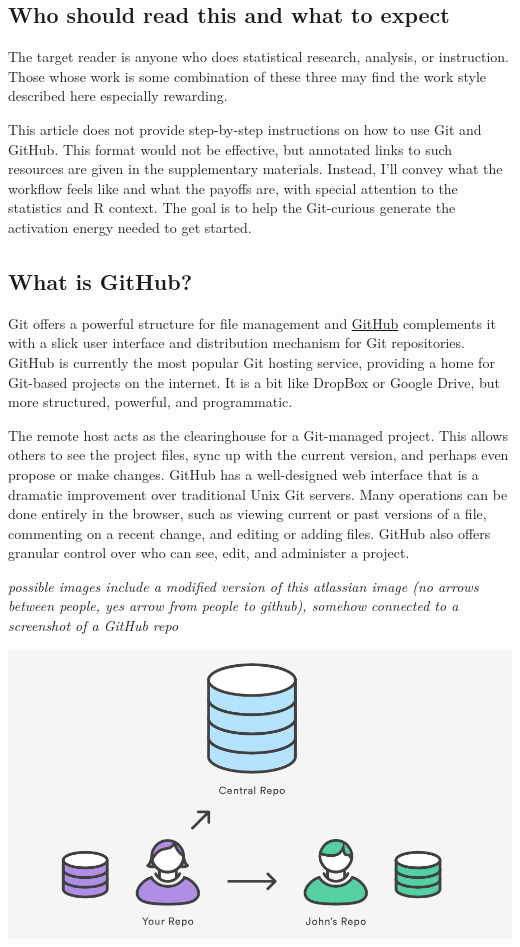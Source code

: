\documentclass[12pt]{article}
\begin{document}
\subsection{Who should read this and what to
expect}\label{who-should-read-this-and-what-to-expect}

The target reader is anyone who does statistical research, analysis, or
instruction. Those whose work is some combination of these three may
find the work style described here especially rewarding.

This article does not provide step-by-step instructions on how to use
Git and GitHub. This format would not be effective, but annotated links
to such resources are given in the supplementary materials. Instead,
I'll convey what the workflow feels like and what the payoffs are, with
special attention to the statistics and R context. The goal is to help
the Git-curious generate the activation energy needed to get started.

\subsection{What is GitHub?}\label{what-is-github}

Git offers a powerful structure for file management and
\href{https://github.com}{GitHub} complements it with a slick user
interface and distribution mechanism for Git repositories. GitHub is
currently the most popular Git hosting service, providing a home for
Git-based projects on the internet. It is a bit like DropBox or Google
Drive, but more structured, powerful, and programmatic.

The remote host acts as the clearinghouse for a Git-managed project.
This allows others to see the project files, sync up with the current
version, and perhaps even propose or make changes. GitHub has a
well-designed web interface that is a dramatic improvement over
traditional Unix Git servers. Many operations can be done entirely in
the browser, such as viewing current or past versions of a file,
commenting on a recent change, and editing or adding files. GitHub also
offers granular control over who can see, edit, and administer a
project.

\emph{possible images include a modified version of this atlassian image
(no arrows between people, yes arrow from people to github), somehow
connected to a screenshot of a GitHub repo}

\includegraphics[width=1\linewidth]{atlassian-git-tutorials-syncing}
\end{document}
